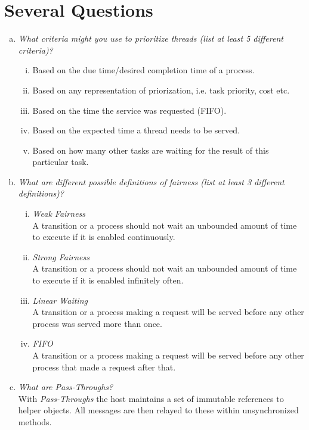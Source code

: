 \documentclass{report}
\author{Marcel \textsc{Zauder} 16-124-836 \\
	Pascal \textsc{Gerig} 16-104-721}
\begin{document}
	\section{Several Questions}
	\startsection
		\begin{enumerate}[a)]
			\item \textit{What criteria might you use to prioritize threads (list at least 5 different criteria)?}
			\begin{enumerate}[(i)]
				\item Based on the due time/desired completion time of a process.
				\item Based on any representation of priorization, i.e. task priority, cost etc.
				\item Based on the time the service was requested (FIFO).
				\item Based on the expected time a thread needs to be served.
				\item Based on how many other tasks are waiting for the result of  this particular task.
			\end{enumerate}
			\item \textit{What are different possible definitions of fairness (list at least 3 different definitions)?}
			\begin{enumerate}[(i)]
				\item \textit{Weak Fairness} \\
				A transition or a process should not wait an unbounded amount of time to execute if it is enabled continuously.
				\item \textit{Strong Fairness} \\
				A transition or a process should not wait an unbounded amount of time to execute if it is enabled infinitely often.
				\item \textit{Linear Waiting} \\
				A transition or a process making a request will be served before any other process was served more than once.
				\item \textit{FIFO} \\
				A transition or a process making a request will be served before any other process that made a request after that.
			\end{enumerate}
			\item \textit{What are Pass-Throughs?} \\
			With \textit{Pass-Throughs} the host maintains a set of immutable references to helper objects. All messages are then relayed to these within unsynchronized methods.

\end{enumerate}
\end{document}

